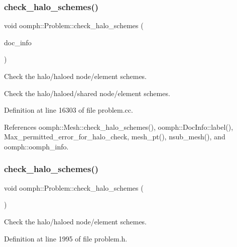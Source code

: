 \subsubsection{\texorpdfstring{check\+\_\+halo\+\_\+schemes()}{check\_halo\_schemes()}\hspace{0.1cm}{\footnotesize\ttfamily [1/2]}}
{\footnotesize\ttfamily void oomph\+::\+Problem\+::check\+\_\+halo\+\_\+schemes (\begin{DoxyParamCaption}\item[{\hyperlink{classoomph_1_1DocInfo}{Doc\+Info} \&}]{doc\+\_\+info }\end{DoxyParamCaption})}



Check the halo/haloed node/element schemes. 

Check the halo/haloed/shared node/element schemes. 

Definition at line 16303 of file problem.\+cc.



References oomph\+::\+Mesh\+::check\+\_\+halo\+\_\+schemes(), oomph\+::\+Doc\+Info\+::label(), Max\+\_\+permitted\+\_\+error\+\_\+for\+\_\+halo\+\_\+check, mesh\+\_\+pt(), nsub\+\_\+mesh(), and oomph\+::oomph\+\_\+info.

\mbox{\label{classoomph_1_1Problem_a8dd5cb241ce6218fb476931e0879d7c8}} 
\subsubsection{\texorpdfstring{check\+\_\+halo\+\_\+schemes()}{check\_halo\_schemes()}\hspace{0.1cm}{\footnotesize\ttfamily [2/2]}}
{\footnotesize\ttfamily void oomph\+::\+Problem\+::check\+\_\+halo\+\_\+schemes (\begin{DoxyParamCaption}{ }\end{DoxyParamCaption})\hspace{0.3cm}{\ttfamily [inline]}}



Check the halo/haloed node/element schemes. 



Definition at line 1995 of file problem.\+h.



